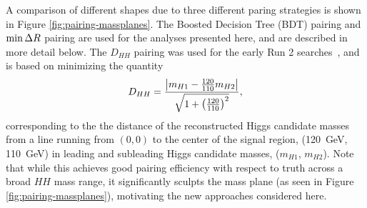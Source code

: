 A comparison of different shapes due to three different paring strategies is shown in
Figure \ref{fig:pairing-massplanes}. The Boosted Decision Tree (BDT) pairing and $\min{\ensuremath{\Delta R}}$ pairing 
are used for the analyses presented here, and are described in more detail below. The $D_{HH}$ pairing 
was used for the early Run 2 searches~\cite{EXOT-2016-31}, and is based on minimizing the quantity 
\begin{equation}
D_{HH} = \frac{\qty|m_{H1} - \frac{120}{110}m_{H2}|}{\sqrt{1+\qty(\frac{120}{110})^2}},
\end{equation}
corresponding to the the distance of the reconstructed Higgs candidate masses from a line 
running from $(0, 0)$ to the center of the signal region, (\SI{120}{\GeV}, \SI{110}{\GeV}) in 
leading and subleading Higgs candidate masses, ($m_{H1}$, $m_{H2}$). Note that while 
this achieves good pairing efficiency with respect to truth across a broad $HH$ mass range, it significantly 
sculpts the mass plane (as seen in Figure \ref{fig:pairing-massplanes}), motivating the new 
approaches considered here.


